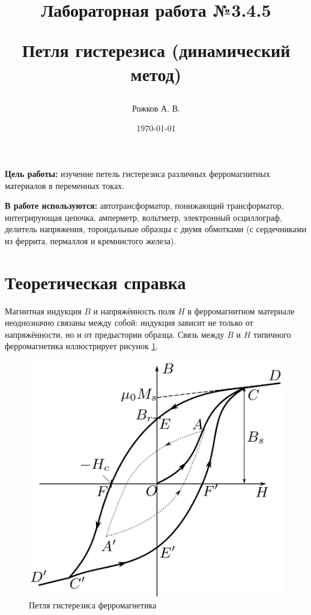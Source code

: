 \documentclass[a4paper, 12pt]{article}
\title{\begin{center}Лабораторная работа №3.4.5\end{center}
Петля гистерезиса (динамический метод)}
\author{Рожков А. В.}
\date{\today}
\begin{document}
    \maketitle
    \newpage

    \textbf{Цель работы:} изучение петель гистерезиса различных ферромагнитных материалов в переменных токах.

    \textbf{В работе используются:} автотрансформатор, понижающий трансформатор, интегрирующая цепочка, амперметр, вольтметр, электронный осциллограф, делитель напряжения, тороидальные образцы с двумя обмотками (с сердечниками из феррита, пермаллоя и кремнистого железа).

    \section{Теоретическая справка}

        Магнитная индукция $B$ и напряжённость поля $H$ в ферромагнитном материале неоднозначно связаны между собой: индукция зависит не только от напряжённости, но и от предыстории образца. Связь между $B$ и $H$ типичного ферромагнетика иллюстрирует рисунок \ref{theor}.

        \begin{figure}[h]
            \centering
            \includegraphics[scale=0.45]{img/theor.png}
            \caption{Петля гистерезиса ферромагнетика} \label{theor}
        \end{figure}
\end{document}
